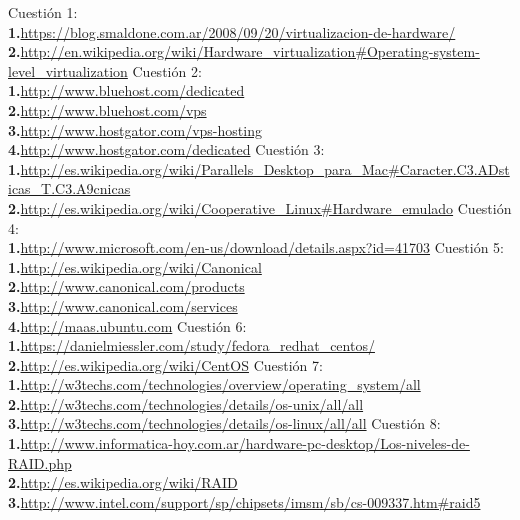 \documentclass[a4paper, 11pt]{article} %
\begin{document}
\pagebreak
\begin{thebibliography}{X}
 Cuestión 1:\\ 
 \textbf{1.}\url{https://blog.smaldone.com.ar/2008/09/20/virtualizacion-de-hardware/ }\\
 \textbf{2.}\url{http://en.wikipedia.org/wiki/Hardware_virtualization#Operating-system-level_virtualization}
 Cuestión 2:\\ 
 \textbf{1.}\url{http://www.bluehost.com/dedicated}\\
 \textbf{2.}\url{http://www.bluehost.com/vps}\\
 \textbf{3.}\url{http://www.hostgator.com/vps-hosting}\\
 \textbf{4.}\url{http://www.hostgator.com/dedicated}
 Cuestión 3:\\
 \textbf{1.}\url{http://es.wikipedia.org/wiki/Parallels_Desktop_para_Mac#Caracter.C3.ADsticas_T.C3.A9cnicas}\\
 \textbf{2.}\url{http://es.wikipedia.org/wiki/Cooperative_Linux#Hardware_emulado}
 Cuestión 4:\\
	\textbf{1.}\url{http://www.microsoft.com/en-us/download/details.aspx?id=41703}
 Cuestión 5:\\
	\textbf{1.}\url{http://es.wikipedia.org/wiki/Canonical}\\
	\textbf{2.}\url{http://www.canonical.com/products}\\
	\textbf{3.}\url{http://www.canonical.com/services}\\
	\textbf{4.}\url{http://maas.ubuntu.com}
 Cuestión 6:\\
	\textbf{1.}\url{https://danielmiessler.com/study/fedora_redhat_centos/}\\
	\textbf{2.}\url{http://es.wikipedia.org/wiki/CentOS}
 Cuestión 7:\\
	\textbf{1.}\url{http://w3techs.com/technologies/overview/operating_system/all}\\
	\textbf{2.}\url{http://w3techs.com/technologies/details/os-unix/all/all}\\
	\textbf{3.}\url{http://w3techs.com/technologies/details/os-linux/all/all}
 Cuestión 8:\\
	\textbf{1.}\url{http://www.informatica-hoy.com.ar/hardware-pc-desktop/Los-niveles-de-RAID.php}\\
	\textbf{2.}\url{http://es.wikipedia.org/wiki/RAID}\\
	\textbf{3.}\url{http://www.intel.com/support/sp/chipsets/imsm/sb/cs-009337.htm#raid5}

\end{thebibliography}
\end{document}
